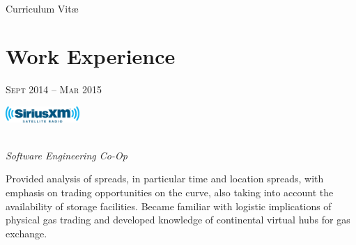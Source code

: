 \documentclass[10pt]{article}
\begin{document}
\color{text1} %




\par{\\ %
{\color{headings} Curriculum {Vit\ae}\\[15pt]\par}
	

\begin{minipage}[t]{0.5\textwidth} %
\vspace{0pt} %
	

\section{Work Experience} 


{\raggedleft\textsc{Sept 2014 -- Mar 2015}\par}

\includegraphics[height=0.6cm]{siriusxm}
{\raggedright\large \\
\textit{Software Engineering Co-Op}\\[5pt]}

\normalsize{Provided analysis of spreads, in particular time and location spreads, with emphasis on trading opportunities on the curve, also taking into account the availability of storage facilities. Became familiar with logistic implications of physical gas trading and developed knowledge of continental virtual hubs for gas exchange.}\\


\end{minipage}}
\end{document}
